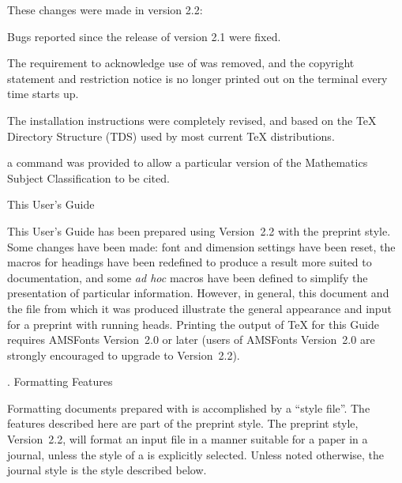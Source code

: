 These changes were made in version 2.2:
\roster
\item Bugs reported since the release of version 2.1 were fixed.
\item The requirement to acknowledge use of \AmSTeX{} was removed, and
  the copyright statement and restriction notice is no longer printed
  out on the terminal every time \AmSTeX{} starts up.
\item The installation instructions were completely revised, and based
  on the \TeX{} Directory Structure (TDS) used by most current \TeX{}
  distributions.
\item a  command was provided to allow a particular
  version of the Mathematics Subject Classification to be cited.
\endroster

\subhead This User's Guide\endsubhead

This User's Guide has been prepared using \AmSTeX{} Version~2.2 with the
preprint style.  Some changes have been made: font and dimension settings
have been reset, the macros for headings have been redefined to produce a
result more suited to documentation, and some {\it ad hoc\/} macros have
been defined to simplify the presentation of particular information.
However, in general, this document and the file from which it was produced
illustrate the general appearance and input for a preprint with running
heads.  Printing the output of \TeX{} for this Guide requires AMSFonts
Version~2.0 or later
(users of AMSFonts Version~2.0 are strongly encouraged to upgrade to
Version~2.2).



. Formatting Features
\endhead

Formatting documents prepared with \AmSTeX{} is accomplished by a
``style file''.  The features described here are part of the preprint
style.  The \AmSTeX{} preprint style, Version~2.2, will format an input
file in a manner suitable for a paper in a journal, unless  the style of
a  is explicitly selected.  Unless noted otherwise,
the journal style is the style described below.

